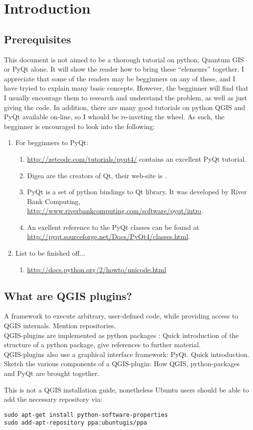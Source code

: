 \section{Introduction}
\label{sect:introduction}

\subsection{Prerequisites}
\label{ssect:prerequisites}
This document is not aimed to be a thorough tutorial on python, Quantum GIS or PyQt alone. It will show the reader how to bring these ``elemenrs'' together. I appreciate that some of the readers may be begginners on any of these, and I have tryied to explain many basic concepts. However, the begginner will find that I usually encourage them to research and understand the problem, as well as just giving the code. In addition, there are many good tutorials on python QGIS and PyQt available on-line, so I whould be re-inveting the wheel. As such, the begginner is encouraged to look into the following:
\begin{enumerate}
  \item For begginners to PyQt:
  \begin{enumerate}
    \item \url{http://zetcode.com/tutorials/pyqt4/} contains an excellent PyQt tutorial.
    \item Digea are the creators of Qt, their web-site is \url{}.
    \item PyQt is a set of python bindings to Qt library. It was developed by River Bank Computing, \url{http://www.riverbankcomputing.com/software/pyqt/intro}.
    \item An exellent reference to the PyQt classes can be found at \url{http://pyqt.sourceforge.net/Docs/PyQt4/classes.html}.
  \end{enumerate}
  \item List to be finished off...
  \begin{enumerate}
    \item \url{http://docs.python.org/2/howto/unicode.html}
  \end{enumerate}
\end{enumerate}

\subsection{What are QGIS plugins?}
\par
A framework to execute arbitrary, user-defined code, while providing access to QGIS internals. Mention repositories.\\
QGIS-plugins are implemented as python packages : Quick introduction of the structure of a python package, give references to further material.\\
QGIS-plugins also use a graphical interface framework: PyQt. Quick introduction.\\
Sketch the various components of a QGIS-plugin: How QGIS, python-packages and PyQt are brought together.

This is not a QGIS installation guide, nonetheless Ubuntu users should be able to add the necessary repository via:
\begin{lstlisting}
sudo apt-get install python-software-properties
sudo add-apt-repository ppa:ubuntugis/ppa
\end{lstlisting}

